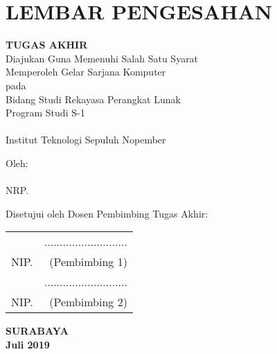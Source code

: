 \chapter{LEMBAR PENGESAHAN}
\small

\begin{center}
	\textbf{\MakeUppercase\judul}
	\vspace*{0.3em}
	
	\textbf{TUGAS AKHIR} \\
	Diajukan Guna Memenuhi Salah Satu Syarat\\
	Memperoleh Gelar Sarjana Komputer\\
	pada\\
	Bidang Studi Rekayasa Perangkat Lunak\\
	Program Studi S-1 \jurusan\\
	\fakultas \\
	Institut Teknologi Sepuluh Nopember
	
	\vspace*{0.3em}
	
	Oleh:\\
	\textbf{\penulis} \\
	NRP. \nrp
	
	\vspace*{1.1em}
\end{center}

Disetujui oleh Dosen Pembimbing Tugas Akhir: \\
\vspace*{1.3em}

\begin{tabularx}{\linewidth}{ @{}l r }
	\pembimbingsatu & ........................... \vspace*{1.4em} \\
	NIP. \nikpembimbingsatu & (Pembimbing 1) \vspace*{2.6em} \\
	
	\pembimbingdua & ........................... \vspace*{1.4em} \\
	NIP. \nikpembimbingdua & (Pembimbing 2) \vspace*{0.9em}
\end{tabularx}

\begin{center}
	\textbf {SURABAYA} \\
	\textbf {Juli 2019}
\end{center}

\normalsize
\cleardoublepage
